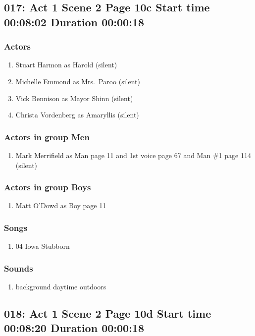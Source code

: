 \subsection{017: Act 1 Scene 2 Page 10c Start time 00:08:02 Duration 00:00:18}

\subsubsection{Actors}
\begin{enumerate}
\item Stuart Harmon as Harold (silent)
\item Michelle Emmond as Mrs.~Paroo (silent)
\item Vick Bennison as Mayor Shinn (silent)
\item Christa Vordenberg as Amaryllis (silent)
\end{enumerate}
\subsubsection{Actors in group Men}
\begin{enumerate}
\item Mark Merrifield as Man page 11 and 1st voice page 67 and Man \#1 page 114 (silent)
\end{enumerate}
\subsubsection{Actors in group Boys}
\begin{enumerate}
\item Matt O'Dowd as Boy page 11
\end{enumerate}

\subsubsection{Songs}
\begin{enumerate}
\item 04 Iowa Stubborn
\end{enumerate}\subsubsection{Sounds}
\begin{enumerate}
\item background daytime outdoors
\end{enumerate}
\subsection{018: Act 1 Scene 2 Page 10d Start time 00:08:20 Duration 00:00:18}

